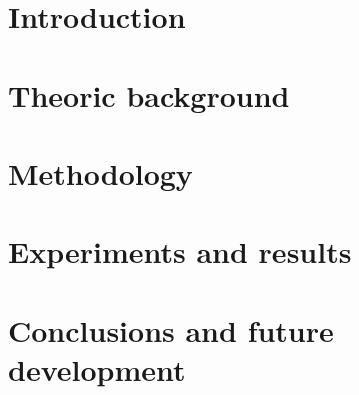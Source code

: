 \documentclass[a4paper,12pt,titlepage]{article}
\begin{document}
\listoffigures
\thispagestyle{empty}

\listoftables
\thispagestyle{empty}

\printglossary[type=\acronymtype,title=Acronyms]
\thispagestyle{empty}

\newpage
{}

\section{Introduction}\label{sec:introduction}


\section{Theoric background}\label{sec:theoric-background}



\section{Methodology}\label{sec:methodology}


\section{Experiments and results}\label{sec:experiments-and-results}


\section{Conclusions and future development}\label{sec:conclusions-and-future-development}


\printbibliography
\end{document}
